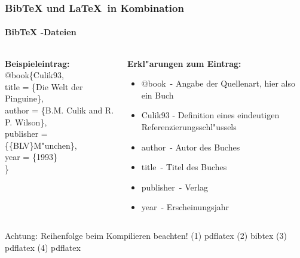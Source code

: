 \begin{frame}
\frametitle{BibTeX und \LaTeX ~in Kombination}
\framesubtitle{BibTeX -Dateien}
\begin{columns}
\begin{column}{0.52\textwidth}
\textbf{Beispieleintrag:}\\[1em]

\color{nounibaredI}$@$book\color{black}\{Culik93,\\
\color{nounibaredI}title\color{black} = \{Die Welt der Pinguine\},\\
\color{nounibaredI}author\color{black} = \{B.M. Culik and R. P. Wilson\},\\
\color{nounibaredI}publisher\color{black} = \{\{BLV\}M"unchen\},\\
\color{nounibaredI}year\color{black} = \{1993\}\\
\}
\end{column}
\begin{column}{0.55\textwidth}
\textbf{Erkl"arungen zum Eintrag:}
\begin{itemize}
\item \color{nounibaredI}$@$book\color{black}~- Angabe der Quellenart, hier also ein Buch
\item Culik93 - Definition eines eindeutigen Referenzierungsschl"ussels
\item \color{nounibaredI}author\color{black}~- Autor des Buches
\item \color{nounibaredI}title\color{black}~- Titel des Buches
\item \color{nounibaredI}publisher\color{black}~- Verlag
\item \color{nounibaredI}year\color{black}~- Erscheinungsjahr
\end{itemize}
\end{column}
\end{columns}
\begin{alertblock}{Achtung: Reihenfolge beim Kompilieren beachten!}
(1) pdflatex (2) bibtex (3) pdflatex (4) pdflatex
\end{alertblock}
\end{frame}

